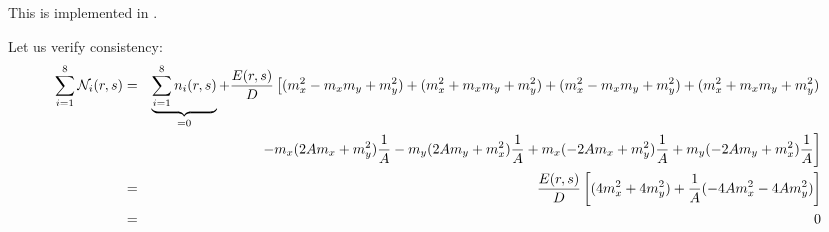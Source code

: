 This is implemented in .


Let us verify consistency:
\begin{eqnarray}
\sum_{i=1}^8 {\mathcal{N}}_i(r,s) 
&=& \underbrace{\sum_{i=1}^8 n_i(r,s)}_{=0} + \frac{E(r,s)}{D} 
\left[
(m_x^2 - m_xm_y + m_y^2)
+(m_x^2 + m_xm_y + m_y^2)
+(m_x^2 - m_xm_y + m_y^2)
+(m_x^2 + m_xm_y + m_y^2) \right. \nonumber\\
&& \left.
-m_x(2Am_x+m_y^2)\frac{1}{A}
-m_y(2Am_y+m_x^2)\frac{1}{A}
+m_x(-2Am_x+m_y^2)\frac{1}{A}
+m_y(-2Am_y+m_x^2)\frac{1}{A}
\right] \nonumber\\
&=& \frac{E(r,s)}{D}
\left[(4m_x^2 + 4m_y^2) + \frac{1}{A} (-4Am_x^2 - 4A m_y^2) \right]  \\
&=& 0
\end{eqnarray}


